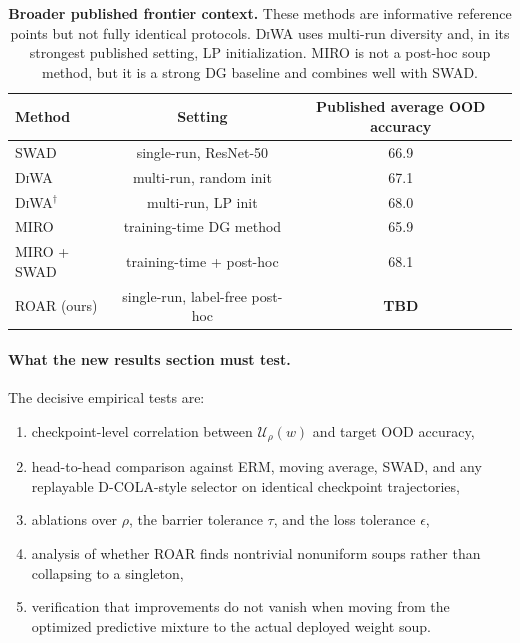 \documentclass{article}
\newcommand{\TBD}{\textbf{TBD}}
\newcommand{\ood}{OOD}
\newcommand{\roar}{\textup{\textsc{ROAR}}}
\newcommand{\swad}{\textup{\textsc{SWAD}}}
\newcommand{\dcola}{\textup{\textsc{D-COLA}}}
\newcommand{\diwa}{\textup{\textsc{DiWA}}}
\newcommand{\miro}{\textup{\textsc{MIRO}}}
\begin{document}
\begin{table}[t]
    \centering
    \small
    \caption{\textbf{Broader published frontier context.} These methods are informative reference points but not fully identical protocols. \diwa{} uses multi-run diversity and, in its strongest published setting, LP initialization. \miro{} is not a post-hoc soup method, but it is a strong DG baseline and combines well with \swad{}.}
    \label{tab:frontier}
    \begin{tabular}{lcc}
        \toprule
        Method & Setting & Published average \ood{} accuracy \\
        \midrule
        \swad{} \citep{cha2021swad} & single-run, ResNet-50 & 66.9 \\
        \diwa{} \citep{rame2022diwa} & multi-run, random init & 67.1 \\
        \diwa{}$^{\dagger}$ \citep{rame2022diwa} & multi-run, LP init & 68.0 \\
        \miro{} \citep{cha2022miro} & training-time DG method & 65.9 \\
        \miro{} + \swad{} \citep{cha2022miro} & training-time + post-hoc & 68.1 \\
        \roar{} (ours) & single-run, label-free post-hoc & \TBD{} \\
        \bottomrule
    \end{tabular}
\end{table}

\paragraph{What the new results section must test.}
The decisive empirical tests are:
\begin{enumerate}[leftmargin=1.4em]
    \item checkpoint-level correlation between $\mathcal U_{\rho}(w)$ and target \ood{} accuracy,
    \item head-to-head comparison against ERM, moving average, \swad{}, and any replayable \dcola{}-style selector on identical checkpoint trajectories,
    \item ablations over $\rho$, the barrier tolerance $\tau$, and the loss tolerance $\epsilon$,
    \item analysis of whether \roar{} finds nontrivial nonuniform soups rather than collapsing to a singleton,
    \item verification that improvements do not vanish when moving from the optimized predictive mixture to the actual deployed weight soup.
\end{enumerate}
\end{document}
